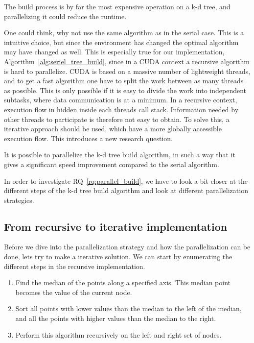 The build process is by far the most expensive operation on a k-d tree, and parallelizing it could reduce the runtime.

One could think, why not use the same algorithm as in the serial case. This is a intuitive choice, but since the environment has changed the optimal algorithm may have changed as well. This is especially true for our implementation, Algorithm~\ref{alg:seriel_tree_build}, since in a CUDA context a recursive algorithm is hard to parallelize. CUDA is based on a massive number of lightweight threads, and to get a fast algorithm one have to split the work between as many threads as possible. This is only possible if it is easy to divide the work into independent subtasks, where data communication is at a minimum. In a recursive context, execution flow in hidden inside each threads call stack. Information needed by other threads to participate is therefore not easy to obtain. To solve this, a iterative approach should be used, which have a more globally accessible execution flow. This introduces a new research question.

\begin{myrq}
\label{rq:parallel_build}
    It is possible to parallelize the k-d tree build algorithm, in such a way that it gives a significant speed improvement compared to the serial algorithm.
\end{myrq}

In order to investigate RQ~\ref{rq:parallel_build}, we have to look a bit closer at the different steps of the k-d tree build algorithm and look at different parallelization strategies.

\subsection{From recursive to iterative implementation} %
\label{ssub:from_recursive_to_iterative_implementation}

Before we dive into the parallelization strategy and how the parallelization can be done, lets try to make a iterative solution. We can start by enumerating the different steps in the recursive implementation.

\begin{enumerate}
    \item Find the median of the points along a specified axis. This median point becomes the value of the current node.
    \item Sort all points with lower values than the median to the left of the median, and all the points with higher values than the median to the right.
    \item Perform this algorithm recursively on the left and right set of nodes.
\end{enumerate}

